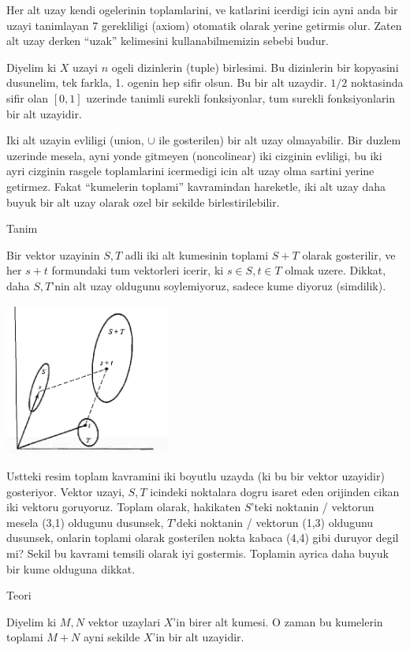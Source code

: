 \documentclass[12pt,fleqn]{article}
\begin{document}
Her alt uzay kendi ogelerinin toplamlarini, ve katlarini icerdigi icin ayni
anda bir uzayi tanimlayan 7 gerekliligi (axiom) otomatik olarak yerine
getirmis olur. Zaten alt uzay derken ``uzak'' kelimesini kullanabilmemizin
sebebi budur. 

Diyelim ki $X$ uzayi $n$ ogeli dizinlerin (tuple) birlesimi. Bu dizinlerin
bir kopyasini dusunelim, tek farkla, 1. ogenin hep sifir olsun. Bu bir alt
uzaydir. $1/2$ noktasinda sifir olan $[0,1]$ uzerinde tanimli surekli
fonksiyonlar, tum surekli fonksiyonlarin bir alt uzayidir. 

Iki alt uzayin evliligi (union, $\cup$ ile gosterilen) bir alt uzay
olmayabilir. Bir duzlem uzerinde mesela, ayni yonde gitmeyen (noncolinear)
iki cizginin evliligi, bu iki ayri cizginin rasgele toplamlarini icermedigi
icin alt uzay olma sartini yerine getirmez. Fakat ``kumelerin toplami''
kavramindan hareketle, iki alt uzay daha buyuk bir alt uzay olarak ozel bir
sekilde birlestirilebilir.

Tanim

Bir vektor uzayinin $S,T$ adli iki alt kumesinin toplami $S+T$ olarak
gosterilir, ve her $s+t$ formundaki tum vektorleri icerir, ki $s \in S,t
\in T$ 
olmak uzere. Dikkat, daha $S,T$'nin alt uzay oldugunu soylemiyoruz, sadece
kume diyoruz (simdilik). 

\includegraphics[height=5cm]{3_1.png}

Ustteki resim toplam kavramini iki boyutlu uzayda (ki bu bir vektor
uzayidir) gosteriyor. Vektor uzayi, $S,T$ icindeki noktalara dogru isaret
eden orijinden cikan iki vektoru goruyoruz. Toplam olarak, hakikaten
$S$'teki noktanin / vektorun mesela (3,1) oldugunu dusunsek, $T$'deki
noktanin / vektorun (1,3) oldugunu dusunsek, onlarin toplami olarak
gosterilen nokta kabaca (4,4) gibi duruyor degil mi? Sekil bu kavrami
temsili olarak iyi gostermis. Toplamin ayrica daha buyuk bir kume olduguna
dikkat. 

Teori 

Diyelim ki $M,N$ vektor uzaylari $X$'in birer alt kumesi. O zaman bu kumelerin
toplami $M + N$ ayni sekilde $X$'in bir alt uzayidir. 
\end{document}
